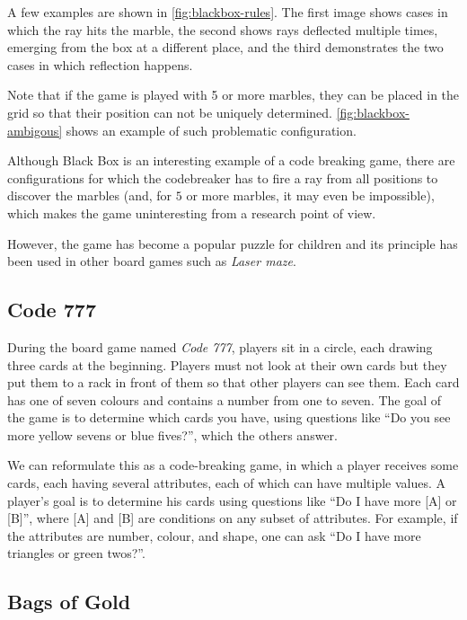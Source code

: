
A few examples are shown in \autoref{fig:blackbox-rules}.
The first image shows cases in which the ray hits the marble,
  the second shows rays deflected multiple times, emerging from
  the box at a different place, and the third demonstrates
  the two cases in which reflection happens.

Note that if the game is played with 5 or more marbles,
  they can be placed in the grid so that their position can
  not be uniquely determined.
\autoref{fig:blackbox-ambigous} shows an example of such
  problematic configuration.

Although Black Box is an interesting example of a code breaking game,
  there are configurations for which the codebreaker has to fire a ray from
  all positions to discover the marbles
  (and, for $5$ or more marbles, it may even be impossible),
  which makes the game uninteresting from a research point of view.

However, the game has become a popular puzzle for children and
  its principle has been used in other board games such as \emph{Laser maze}\cite{lasermaze}.

\subsection{Code 777}

During the board game named \emph{Code 777}, players sit in a circle,
  each drawing three cards at the beginning.
Players must not look at their own cards but they put them to a rack in front of them
  so that other players can see them.
Each card has one of seven colours and contains a number from one to seven.
The goal of the game is to determine which cards you have, using questions like
 ``Do you see more yellow sevens or blue fives?'', which the others answer\cite{code777}.

We can reformulate this as a code-breaking game, in which a player
  receives some cards, each having several attributes, each of which can have
  multiple values.
A player's goal is to determine his cards using questions
  like ``Do I have more [A] or [B]'', where [A] and [B] are conditions on
  any subset of attributes.
For example, if the attributes are number, colour, and shape, one can ask
  ``Do I have more triangles or green twos?''.

\subsection{Bags of Gold}

